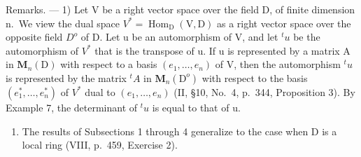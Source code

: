 Remarks. --- 1) Let V be a right vector space over the field D, of finite dimension n.~We view the dual space \(V^{*} = \operatorname{Hom}_{\mathrm{D}}(\mathrm{V}, \mathrm{D})\) as a right vector space over the opposite field \(D^{o}\) of D. Let u be an automorphism of V, and let \(^{t}u\) be the automorphism of \(V^{*}\) that is the transpose of u. If u is represented by a matrix A in \(\mathbf{M}_{n}(\mathrm{D})\) with respect to a basis \((e_{1}, \ldots, e_{n})\) of V, then the automorphism \(^{t}u\) is represented by the matrix \(^{t}A\) in \(\mathbf{M}_{n}(\mathrm{D}^{o})\) with respect to the basis \((e_{1}^{*}, \ldots, e_{n}^{*})\) of \(V^{*}\) dual to \((e_{1}, \ldots, e_{n})\) (II, §10, No.~4, p.~344, Proposition 3). By Example 7, the determinant of \(^{t}u\) is equal to that of u.

\begin{enumerate}
\def\labelenumi{\arabic{enumi})}
\setcounter{enumi}{1}
\tightlist
\item
  The results of Subsections 1 through 4 generalize to the case when D is a local ring (VIII, p.~459, Exercise 2).
\end{enumerate}

